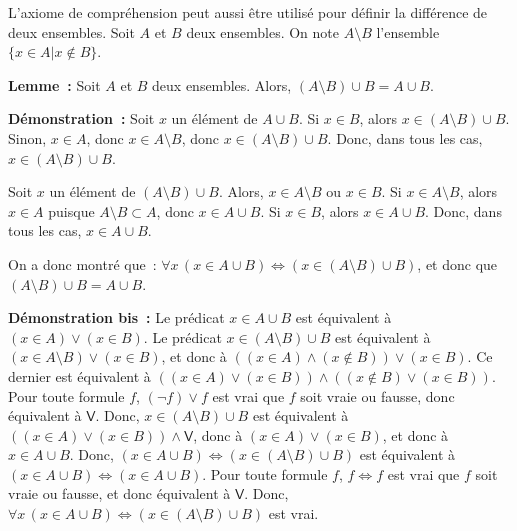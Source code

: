     \done

\medskip

L'axiome de compréhension peut aussi être utilisé pour définir la différence de deux ensembles. 
Soit $A$ et $B$ deux ensembles. 
On note $A \setminus B$ l'ensemble $\lbrace x \in A \vert x \notin B \rbrace$.

\medskip

\noindent\textbf{Lemme :} Soit $A$ et $B$ deux ensembles.
    Alors, $(A \setminus B) \cup B = A \cup B$.

\medskip

\noindent\textbf{Démonstration :}
    Soit $x$ un élément de $A \cup B$. 
    Si $x \in B$, alors $x \in (A \setminus B) \cup B$.
    Sinon, $x \in A$, donc $x \in A \setminus B$, donc $x \in (A \setminus B) \cup B$.
    Donc, dans tous les cas, $x \in (A \setminus B) \cup B$.

    Soit $x$ un élément de $(A \setminus B) \cup B$.
    Alors, $x \in A \setminus B$ ou $x \in B$. 
    Si $x \in A \setminus B$, alors $x \in A$ puisque $A \setminus B \subset A$, donc $x \in A \cup B$.
    Si $x \in B$, alors $x \in A \cup B$.
    Donc, dans tous les cas, $x \in A \cup B$.

    On a donc montré que : $\forall x \, (x \in A \cup B) \Leftrightarrow (x \in (A \setminus B) \cup B)$, et donc que $(A \setminus B) \cup B = A \cup B$.

    \done

\medskip

\noindent\textbf{Démonstration bis :} 
    Le prédicat $x \in A \cup B$ est équivalent à $(x \in A) \vee (x \in B)$.
    Le prédicat $x \in (A \setminus B) \cup B$ est équivalent à $(x \in A \setminus B) \vee (x \in B)$, et donc à $((x \in A) \wedge (x \notin B)) \vee (x \in B)$.
    Ce dernier est équivalent à $((x \in A) \vee (x \in B)) \wedge ((x \notin B) \vee (x \in B))$.
    Pour toute formule $f$, $(\neg f) \vee f$ est vrai que $f$ soit vraie ou fausse, donc équivalent à $\mathsf{V}$.
    Donc, $x \in (A \setminus B) \cup B$ est équivalent à $((x \in A) \vee (x \in B)) \wedge \mathsf{V}$, donc à $(x \in A) \vee (x \in B)$, et donc à $x \in A \cup B$.
    Donc, $(x \in A \cup B) \Leftrightarrow (x \in (A \setminus B) \cup B)$ est équivalent à $(x \in A \cup B) \Leftrightarrow (x \in A \cup B)$.
    Pour toute formule $f$, $f \Leftrightarrow f$ est vrai que $f$ soit vraie ou fausse, et donc équivalent à $\mathsf{V}$.
    Donc, $\forall x \, (x \in A \cup B) \Leftrightarrow (x \in (A \setminus B) \cup B)$ est vrai.

